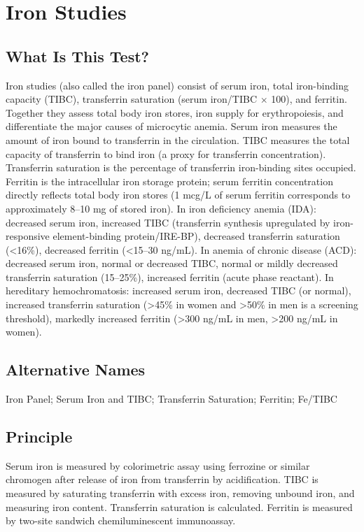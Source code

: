 \chapter{Iron Studies}
\section*{What Is This Test?}
Iron studies (also called the iron panel) consist of serum iron, total iron-binding capacity (TIBC), transferrin saturation (serum iron/TIBC $\times$ 100), and ferritin. Together they assess total body iron stores, iron supply for erythropoiesis, and differentiate the major causes of microcytic anemia. Serum iron measures the amount of iron bound to transferrin in the circulation. TIBC measures the total capacity of transferrin to bind iron (a proxy for transferrin concentration). Transferrin saturation is the percentage of transferrin iron-binding sites occupied. Ferritin is the intracellular iron storage protein; serum ferritin concentration directly reflects total body iron stores (1 mcg/L of serum ferritin corresponds to approximately 8--10 mg of stored iron). In iron deficiency anemia (IDA): decreased serum iron, increased TIBC (transferrin synthesis upregulated by iron-responsive element-binding protein/IRE-BP), decreased transferrin saturation (<16\%), decreased ferritin (<15--30 ng/mL). In anemia of chronic disease (ACD): decreased serum iron, normal or decreased TIBC, normal or mildly decreased transferrin saturation (15--25\%), increased ferritin (acute phase reactant). In hereditary hemochromatosis: increased serum iron, decreased TIBC (or normal), increased transferrin saturation (>45\% in women and >50\% in men is a screening threshold), markedly increased ferritin (>300 ng/mL in men, >200 ng/mL in women).
\section*{Alternative Names}
Iron Panel; Serum Iron and TIBC; Transferrin Saturation; Ferritin; Fe/TIBC
\section*{Principle}
Serum iron is measured by colorimetric assay using ferrozine or similar chromogen after release of iron from transferrin by acidification. TIBC is measured by saturating transferrin with excess iron, removing unbound iron, and measuring iron content. Transferrin saturation is calculated. Ferritin is measured by two-site sandwich chemiluminescent immunoassay.
